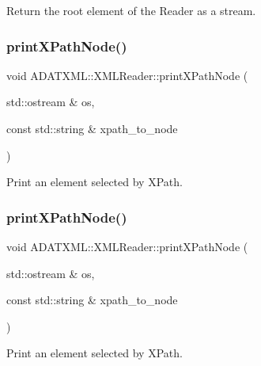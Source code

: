 Return the root element of the Reader as a stream. 

\mbox{\label{classADATXML_1_1XMLReader_ae1bbeacb282c3e9b33750d36aea11d32}} 
\subsubsection{\texorpdfstring{printXPathNode()}{printXPathNode()}\hspace{0.1cm}{\footnotesize\ttfamily [1/2]}}
{\footnotesize\ttfamily void A\+D\+A\+T\+X\+M\+L\+::\+X\+M\+L\+Reader\+::print\+X\+Path\+Node (\begin{DoxyParamCaption}\item[{std\+::ostream \&}]{os,  }\item[{const std\+::string \&}]{xpath\+\_\+to\+\_\+node }\end{DoxyParamCaption})}



Print an element selected by X\+Path. 

\mbox{\label{classADATXML_1_1XMLReader_ae1bbeacb282c3e9b33750d36aea11d32}} 
\subsubsection{\texorpdfstring{printXPathNode()}{printXPathNode()}\hspace{0.1cm}{\footnotesize\ttfamily [2/2]}}
{\footnotesize\ttfamily void A\+D\+A\+T\+X\+M\+L\+::\+X\+M\+L\+Reader\+::print\+X\+Path\+Node (\begin{DoxyParamCaption}\item[{std\+::ostream \&}]{os,  }\item[{const std\+::string \&}]{xpath\+\_\+to\+\_\+node }\end{DoxyParamCaption})}



Print an element selected by X\+Path. 

